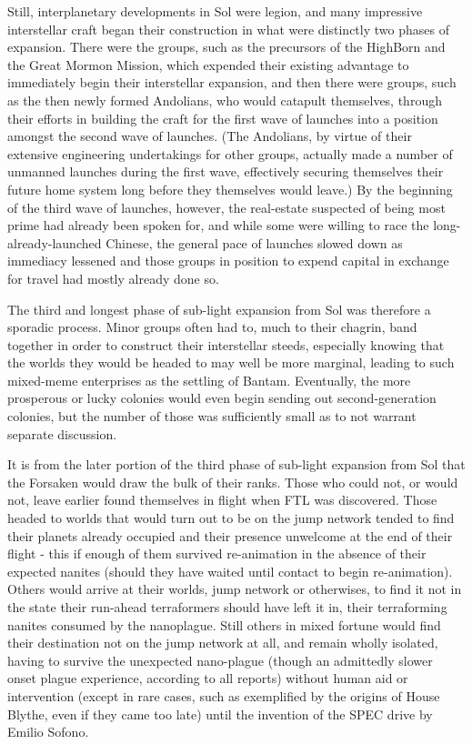 Still, interplanetary developments in Sol were legion, and many
impressive interstellar craft began their construction in what were
distinctly two phases of expansion. There were the groups, such as the
precursors of the HighBorn and the Great Mormon Mission, which
expended their existing advantage to immediately begin their
interstellar expansion, and then there were groups, such as the then
newly formed Andolians, who would catapult themselves, through their
efforts in building the craft for the first wave of launches into a
position amongst the second wave of launches. (The Andolians, by
virtue of their extensive engineering undertakings for other groups,
actually made a number of unmanned launches during the first wave,
effectively securing themselves their future home system long before
they themselves would leave.) By the beginning of the third wave of
launches, however, the real-estate suspected of being most prime had
already been spoken for, and while some were willing to race the
long-already-launched Chinese, the general pace of launches slowed
down as immediacy lessened and those groups in position to expend
capital in exchange for travel had mostly already done so.

The third and longest phase of sub-light expansion from Sol was
therefore a sporadic process. Minor groups often had to, much to their
chagrin, band together in order to construct their interstellar
steeds, especially knowing that the worlds they would be headed to may
well be more marginal, leading to such mixed-meme enterprises as the
settling of Bantam. Eventually, the more prosperous or lucky colonies
would even begin sending out second-generation colonies, but the
number of those was sufficiently small as to not warrant separate
discussion.

It is from the later portion of the third phase of sub-light expansion
from Sol that the Forsaken would draw the bulk of their ranks. Those
who could not, or would not, leave earlier found themselves in flight
when FTL was discovered. Those headed to worlds that would turn out to
be on the jump network tended to find their planets already occupied
and their presence unwelcome at the end of their flight - this if
enough of them survived re-animation in the absence of their expected
nanites (should they have waited until contact to begin
re-animation). Others would arrive at their worlds, jump network or
otherwises, to find it not in the state their run-ahead terraformers
should have left it in, their terraforming nanites consumed by the
nanoplague. Still others in mixed fortune would find their destination
not on the jump network at all, and remain wholly isolated, having to
survive the unexpected nano-plague (though an admittedly slower onset
plague experience, according to all reports) without human aid or
intervention (except in rare cases, such as exemplified by the origins
of House Blythe, even if they came too late) until the invention of
the SPEC drive by Emilio Sofono.

